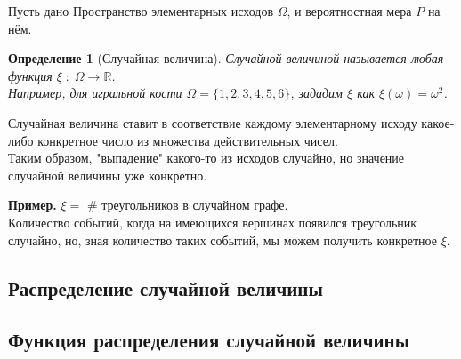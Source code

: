 \documentclass{article}
\theoremstyle{mydef}
\newtheorem{definition}{Определение}
\begin{document}
Пусть дано Пространство элементарных исходов $\Omega$, и вероятностная мера $P$ на нём.

\begin{definition}[Случайная величина]
    Случайной величиной называется любая функция $\xi \; : \; \Omega \rightarrow \mathbb{R}$. \\
    Например, для игральной кости $\Omega = \{1,2,3,4,5,6\}$, зададим $\xi$ как $\xi(\omega) = \omega^2$.
\end{definition}

Случайная величина ставит в соответствие каждому элементарному исходу какое-либо конкретное число из множества действительных чисел. \\
Таким образом, "выпадение" какого-то из исходов случайно, но значение случайной величины уже конкретно.

\textbf{Пример.} $\xi =$ $\#$ треугольников в случайном графе. \\
Количество событий, когда на имеющихся вершинах появился треугольник случайно, но, зная количество таких событий, мы можем получить конкретное $\xi$.

\subsection{Распределение случайной величины}

\subsection{Функция распределения случайной величины}
\end{document}
